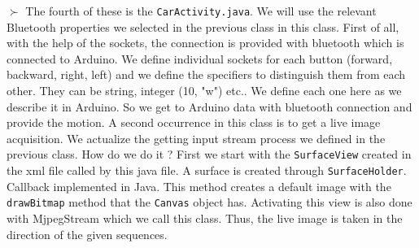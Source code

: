 \documentclass[11pt]{article}
\begin{document}
\begin{flushleft}
$\succ$ The fourth of these is the \verb|CarActivity.java|. We will use the relevant Bluetooth properties we selected in the previous class in this class. First of all, with the help of the sockets, the connection is provided with bluetooth which is connected to Arduino. We define individual sockets for each button (forward, backward, right, left) and we define the specifiers to distinguish them from each other. They can be string, integer (10, "w") etc.. We define each one here as we describe it in Arduino. So we get to Arduino data with bluetooth connection and provide the motion. A second occurrence in this class is to get a live image acquisition. We actualize the getting input stream process we defined in the previous class. How do we do it ? First we start with the \verb|SurfaceView| created in the xml file called by this java file.  A surface is created through \verb|SurfaceHolder|. Callback implemented in Java. This method creates a default image with the \verb|drawBitmap| method that the \verb|Canvas| object has. Activating this view is also done with MjpegStream which we call this class. Thus, the live image is taken in the direction of the given sequences.
\end{flushleft}
\end{document}
